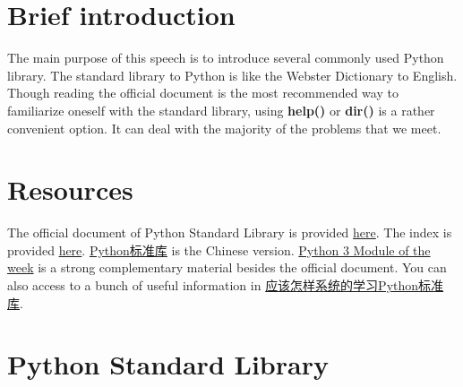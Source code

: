 \documentclass[english]{../TeXTemplate/pkupaper}
\title{\titlemark}
\author{Yifei Wang}
\date{\today}
\begin{document}
\raggedright

\maketitle
\tableofcontents
\section{Brief introduction}
The main purpose of this speech is to introduce several commonly used Python library. The standard library to Python is like the Webster Dictionary to English. Though reading the official document is the most recommended way to familiarize oneself with the standard library, using \textbf{help()} or \textbf{dir()} is a rather convenient option. It can deal with the majority of the problems that we meet. 

\section{Resources}
The official document of Python Standard Library is provided \href{https://docs.python.org/3.6/library/index.html}{here}. The index is provided \href{https://docs.python.org/3.6/py-modindex.html}{here}.  \href{http://python.usyiyi.cn/translate/python_352/library/index.html}{Python标准库} is the Chinese version. \href{https://pymotw.com/3/index.html}{Python 3 Module of the week} is a strong complementary material besides the official document. You can also access to a bunch of useful information in \href{https://www.zhihu.com/question/22100190}{应该怎样系统的学习Python标准库}.

\section{Python Standard Library}







\end{document}
